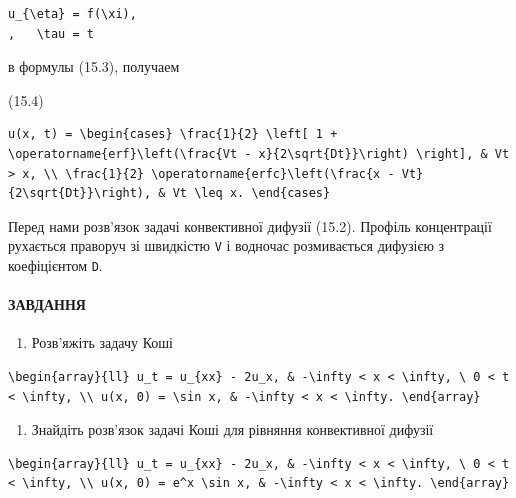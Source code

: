 \documentclass[
  ukrainian,
]{article}
\providecommand{\tightlist}{%
  \setlength{\itemsep}{0pt}\setlength{\parskip}{0pt}}
\begin{document}
\begin{verbatim}
u_{\eta} = f(\xi),
,   \tau = t
\end{verbatim}

в формулы (15.3), получаем

(15.4)

\begin{verbatim}
u(x, t) = \begin{cases} \frac{1}{2} \left[ 1 + \operatorname{erf}\left(\frac{Vt - x}{2\sqrt{Dt}}\right) \right], & Vt > x, \\ \frac{1}{2} \operatorname{erfc}\left(\frac{x - Vt}{2\sqrt{Dt}}\right), & Vt \leq x. \end{cases}
\end{verbatim}

Перед нами розв'язок задачі конвективної дифузії (15.2). Профіль
концентрації рухається праворуч зі швидкістю \texttt{V} і водночас
розмивається дифузією з коефіцієнтом \texttt{D}.

\paragraph{ЗАВДАННЯ}\label{ux437ux430ux432ux434ux430ux43dux43dux44f-1}

\begin{enumerate}
\def\labelenumi{\arabic{enumi}.}
\tightlist
\item
  Розв'яжіть задачу Коші
\end{enumerate}

\begin{verbatim}
\begin{array}{ll} u_t = u_{xx} - 2u_x, & -\infty < x < \infty, \ 0 < t < \infty, \\ u(x, 0) = \sin x, & -\infty < x < \infty. \end{array}
\end{verbatim}

\begin{enumerate}
\def\labelenumi{\arabic{enumi}.}
\setcounter{enumi}{1}
\tightlist
\item
  Знайдіть розв'язок задачі Коші для рівняння конвективної дифузії
\end{enumerate}

\begin{verbatim}
\begin{array}{ll} u_t = u_{xx} - 2u_x, & -\infty < x < \infty, \ 0 < t < \infty, \\ u(x, 0) = e^x \sin x, & -\infty < x < \infty. \end{array}
\end{verbatim}
\end{document}
